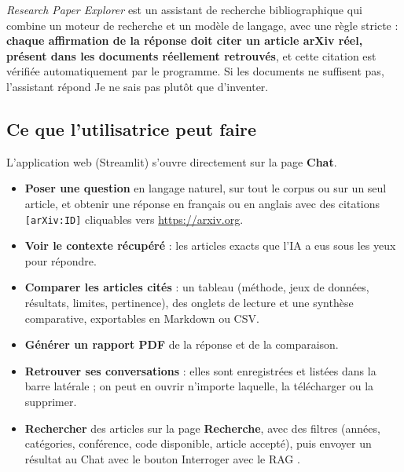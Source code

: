 \documentclass[11pt,a4paper]{article}
\newcommand{\code}[1]{\texttt{#1}}
\begin{document}
\emph{Research Paper Explorer} est un assistant de recherche bibliographique qui combine
un moteur de recherche et un modèle de langage, avec une règle stricte : \textbf{chaque
affirmation de la réponse doit citer un article arXiv réel, présent dans les documents
réellement retrouvés}, et cette citation est vérifiée automatiquement par le programme.
Si les documents ne suffisent pas, l'assistant répond \og Je ne sais pas \fg{} plutôt que
d'inventer.

\subsection{Ce que l'utilisatrice peut faire}

L'application web (Streamlit) s'ouvre directement sur la page \textbf{Chat}.

\begin{itemize}[leftmargin=1.2em]
  \item \textbf{Poser une question} en langage naturel, sur tout le corpus ou sur un seul
  article, et obtenir une réponse en français ou en anglais avec des citations
  \code{[arXiv:ID]} cliquables vers \url{https://arxiv.org}.
  \item \textbf{Voir le contexte récupéré} : les articles exacts que l'IA a eus sous les
  yeux pour répondre.
  \item \textbf{Comparer les articles cités} : un tableau (méthode, jeux de données,
  résultats, limites, pertinence), des onglets de lecture et une synthèse comparative,
  exportables en Markdown ou CSV.
  \item \textbf{Générer un rapport PDF} de la réponse et de la comparaison.
  \item \textbf{Retrouver ses conversations} : elles sont enregistrées et listées dans la
  barre latérale ; on peut en ouvrir n'importe laquelle, la télécharger ou la supprimer.
  \item \textbf{Rechercher} des articles sur la page \textbf{Recherche}, avec des filtres
  (années, catégories, conférence, code disponible, article accepté), puis envoyer un
  résultat au Chat avec le bouton \og Interroger avec le RAG \fg{}.
\end{itemize}
\end{document}
